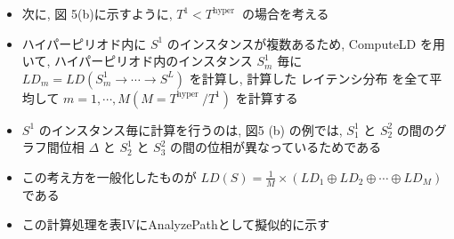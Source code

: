 \begin{frame}{}
    \begin{itemize}
        \item 次に, 図 5(b)に示すように, $T^{1}<T^{\text {hyper }}$ の場合を考える
        \item ハイパーピリオド内に $S^{1}$ のインスタンスが複数あるため, ComputeLD を用いて, ハイパーピリオド内のインスタンス $S_{m}^{1}$ 毎に $L D_{m}=L D\left(S_{m}^{1} \rightarrow \cdots \rightarrow S^{L}\right)$ を計算し, 計算した レイテンシ分布 を全て平均して $m=1, \cdots, M\left(M=T^{\text {hyper }} / T^{1}\right)$ を計算する
        \item $S^{1}$ のインスタンス毎に計算を行うのは, 図5 (b) の例では, $S_{1}^{1}$ と $S_{2}^{2}$ の間のグラフ間位相 $\Delta$ と $S_{2}^{1}$ と $S_{3}^{2}$ の間の位相が異なっているためである
        \item この考え方を一般化したものが $L D(S)=\frac{1}{M} \times\left(L D_{1} \oplus L D_{2} \oplus \cdots \oplus L D_{M}\right)$ である
        \item この計算処理を表IVにAnalyzePathとして擬似的に示す
    \end{itemize}
\end{frame}




